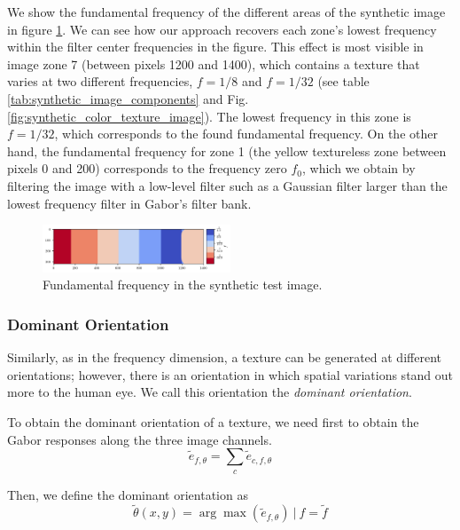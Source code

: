 \documentclass[journal]{IEEEtran}
\begin{document}
We show the fundamental frequency of the different areas of the synthetic image in figure \ref{fig:fund_freq_synth}. We can see how our approach recovers each zone's lowest frequency within the filter center frequencies in the figure. This effect is most visible in image zone 7 (between pixels 1200 and 1400), which contains a texture that varies at two different frequencies, $f = 1/8$ and $f = 1/32$ (see table \ref{tab:synthetic_image_components} and Fig. \ref{fig:synthetic_color_texture_image}). The lowest frequency in this zone is $f = 1/32$, which corresponds to the found fundamental frequency. On the other hand, the fundamental frequency for zone 1 (the yellow textureless zone between pixels 0 and 200) corresponds to the frequency zero $f_0$, which we obtain by filtering the image with a low-level filter such as a Gaussian filter larger than the lowest frequency filter in Gabor's filter bank.

\begin{figure}[!ht]
	\includegraphics[width=0.5\textwidth]{fund_freq_synth}
    \caption{Fundamental frequency in the synthetic test image.}
    \label{fig:fund_freq_synth}
\end{figure}

\subsubsection{Dominant Orientation}
Similarly, as in the frequency dimension, a texture can be generated at different orientations; however, there is an orientation in which spatial variations stand out more to the human eye. We call this orientation the \textit{dominant orientation}.

To obtain the dominant orientation of a texture, we need first to obtain the Gabor responses along the three image channels.
\begin{equation}
	\widetilde{e}_{f, \theta} = \underset{c}{\sum} \widetilde{e}_{c, f, \theta}  \label{eq:gabor_energy_freq_orient}
\end{equation}

Then, we define the dominant orientation as 
\begin{equation}
	\widetilde{\theta}(x,y) =  \arg\max (\widetilde{e}_{f, \theta}) ~|~ f = \widetilde{f} \label{eq:dominant_orient}
\end{equation}
\end{document}
